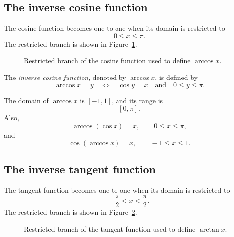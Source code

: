 \subsection{The inverse cosine function}

The cosine function becomes one-to-one when its domain is restricted to
\[
0\le x\le \pi.
\]
The restricted branch is shown in Figure~\ref{fig:restricted-cosine}.

\begin{figure}[tbp]
\centering
{}
\caption{Restricted branch of the cosine function used to define \(\arccos x\).}
\label{fig:restricted-cosine}
\end{figure}

\begin{definition}
The \emph{inverse cosine function}, denoted by \(\arccos x\), is defined by
\[
\arccos x=y
\quad \Longleftrightarrow \quad
\cos y=x
\quad \text{and} \quad
0\le y\le \pi.
\]
\end{definition}

\begin{remark}
The domain of \(\arccos x\) is \([-1,1]\), and its range is
\[
[0,\pi].
\]
Also,
\[
\arccos(\cos x)=x,
\qquad 0\le x\le \pi,
\]
and
\[
\cos(\arccos x)=x,
\qquad -1\le x\le 1.
\]
\end{remark}

\subsection{The inverse tangent function}

The tangent function becomes one-to-one when its domain is restricted to
\[
-\frac{\pi}{2}<x<\frac{\pi}{2}.
\]
The restricted branch is shown in Figure~\ref{fig:restricted-tangent}.

\begin{figure}[tbp]
\centering
{}
\caption{Restricted branch of the tangent function used to define \(\arctan x\).}
\label{fig:restricted-tangent}
\end{figure}

